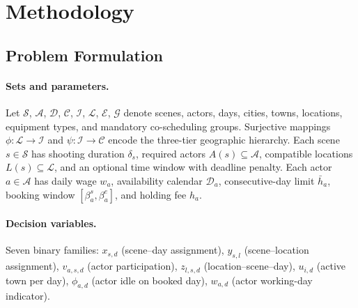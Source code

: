 \section{Methodology}
\label{sec:methodology}

\subsection{Problem Formulation}
\label{sec:formulation}

\paragraph{Sets and parameters.}
Let $\mathcal{S}$, $\mathcal{A}$, $\mathcal{D}$, $\mathcal{C}$, $\mathcal{I}$, $\mathcal{L}$, $\mathcal{E}$, $\mathcal{G}$ denote scenes, actors, days, cities, towns, locations, equipment types, and mandatory co-scheduling groups.
Surjective mappings $\phi: \mathcal{L} \to \mathcal{I}$ and $\psi: \mathcal{I} \to \mathcal{C}$ encode the three-tier geographic hierarchy.
Each scene $s \in \mathcal{S}$ has shooting duration $\delta_s$, required actors $A(s) \subseteq \mathcal{A}$, compatible locations $L(s) \subseteq \mathcal{L}$, and an optional time window with deadline penalty.
Each actor $a \in \mathcal{A}$ has daily wage $w_a$, availability calendar $\mathcal{D}_a$, consecutive-day limit $\bar{h}_a$, booking window $[\beta^s_a, \beta^e_a]$, and holding fee $h_a$.

\paragraph{Decision variables.}
Seven binary families: $x_{s,d}$ (scene--day assignment), $y_{s,l}$ (scene--location assignment), $v_{a,s,d}$ (actor participation), $z_{l,s,d}$ (location--scene--day), $u_{i,d}$ (active town per day), $\phi_{a,d}$ (actor idle on booked day), $w_{a,d}$ (actor working-day indicator).

